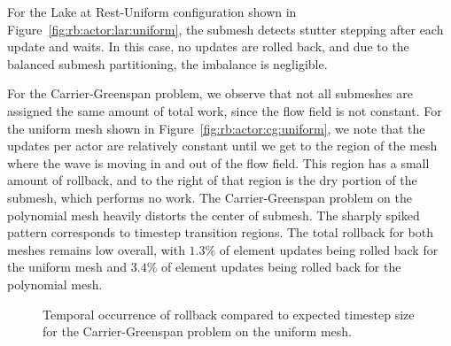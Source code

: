 \documentclass[10pt,letterpaper]{article}
\begin{document}
For the Lake at Rest-Uniform configuration shown in Figure~\ref{fig:rb:actor:lar:uniform}, the submesh detects stutter stepping after each update and waits. In this case, no updates are rolled back, and due to the balanced submesh partitioning, the imbalance is negligible.


For the Carrier-Greenspan problem, we observe that not all submeshes are assigned the same amount of total work, since the flow field is not constant. For the uniform mesh shown in Figure~\ref{fig:rb:actor:cg:uniform}, we note that the updates per actor are relatively constant until we get to the region of the mesh where the wave is moving in and out of the flow field. This region has a small amount of rollback, and to the right of that region is the dry portion of the submesh,
which performs no work. The Carrier-Greenspan problem on the polynomial mesh heavily distorts the center of submesh. The sharply spiked pattern corresponds to timestep transition regions. The total rollback for both meshes remains low overall, with $1.3\%$ of element updates being rolled back for the uniform mesh and $3.4\%$ of element updates being rolled back for the polynomial mesh. 

\begin{figure}
\centering
{}
\caption{Temporal occurrence of rollback compared to expected timestep size for the Carrier-Greenspan problem on the uniform mesh.}
\label{fig:rb:temporal}
\end{figure}
\end{document}
